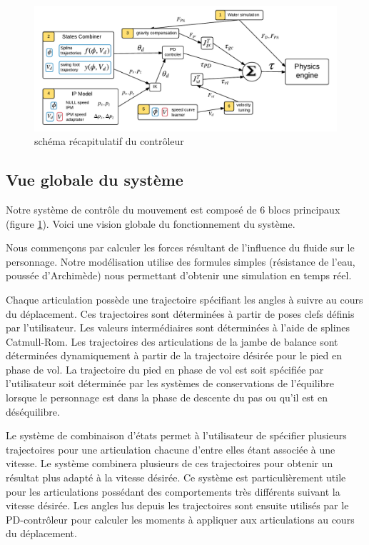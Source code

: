 \documentclass[runningheads,a4paper]{llncs}
\begin{document}
\begin{figure}[h]
\centering
\includegraphics[scale=0.6]{general_process.pdf}
\caption{schéma récapitulatif du contrôleur}
\label{fig:shema_controler}
\end{figure}

\subsection{Vue globale du système}
%


Notre système de contrôle du mouvement est composé de 6 blocs principaux (figure \ref{fig:shema_controler}). Voici une vision globale du fonctionnement du système. 

Nous commençons par calculer les forces résultant de l'influence du fluide sur le personnage. Notre modélisation utilise des formules simples (résistance de l'eau, poussée d'Archimède) nous permettant d'obtenir une simulation en temps réel.

Chaque articulation possède une trajectoire spécifiant les angles à suivre au cours du déplacement. Ces trajectoires sont déterminées à partir de poses clefs définis par l'utilisateur. Les valeurs intermédiaires sont déterminées à l'aide de splines Catmull-Rom. Les trajectoires des articulations de la jambe de balance sont déterminées dynamiquement à partir de la trajectoire désirée pour le pied en phase de vol. La trajectoire du pied en phase de vol est soit spécifiée par l'utilisateur soit déterminée par les systèmes de conservations de l'équilibre lorsque le personnage est dans la phase de descente du pas ou qu'il est en déséquilibre.

Le système de combinaison d'états permet à l'utilisateur de spécifier plusieurs trajectoires pour une articulation chacune d'entre elles étant associée à une vitesse. Le système combinera plusieurs de ces trajectoires pour obtenir un résultat plus adapté à la vitesse désirée. Ce système est particulièrement utile pour les articulations possédant des comportements très différents suivant la vitesse désirée. Les angles lus depuis les trajectoires sont ensuite utilisés par le PD-contrôleur pour calculer les moments à appliquer aux articulations au cours du déplacement.
\end{document}
